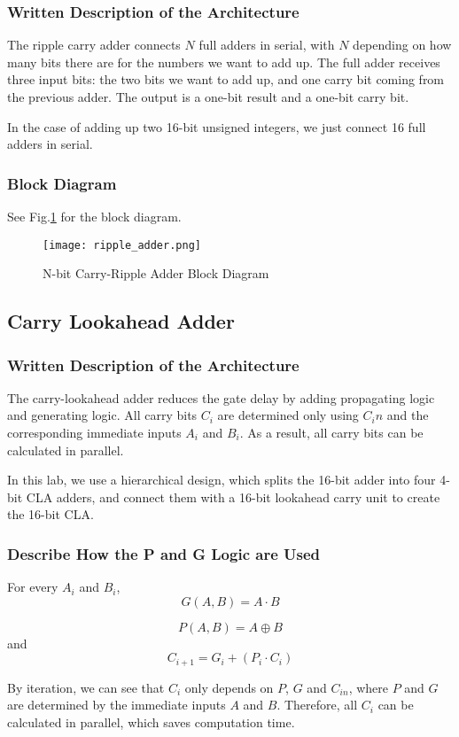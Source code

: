 \documentclass[11pt]{article}
\begin{document}
\subsubsection{Written Description of the Architecture}
The ripple carry adder connects $N$ full adders in serial, with $N$ depending on how many bits there are for the numbers we want to add up. The full adder receives three input bits: the two bits we want to add up, and one carry bit coming from the previous adder. The output is a one-bit result and a one-bit carry bit.

In the case of adding up two 16-bit unsigned integers, we just connect 16 full adders in serial.
\subsubsection{Block Diagram}
See Fig.\ref{ripple} for the block diagram.
\begin{figure}[h]
    \centering
    \texttt{[image: ripple\_adder.png]}
    \caption{N-bit Carry-Ripple Adder Block Diagram}
    \label{ripple}
\end{figure}

\subsection{Carry Lookahead Adder}
\subsubsection{Written Description of the Architecture}
The carry-lookahead adder reduces the gate delay by adding propagating logic and generating logic. All carry bits $C_i$ are determined only using $C_in$ and the corresponding immediate inputs $A_i$ and $B_i$. As a result, all carry bits can be calculated in parallel.

In this lab, we use a hierarchical design, which splits the 16-bit adder into four 4-bit CLA adders, and connect them with a 16-bit lookahead carry unit to create the 16-bit CLA.

\subsubsection{Describe How the P and G Logic are Used}
For every $A_i$ and $B_i$, $$G(A,B)=A\cdot B$$

$$P(A,B)=A\oplus B$$ and $$C_{i+1}=G_i+(P_i\cdot C_i)$$

By iteration, we can see that $C_i$ only depends on $P$, $G$ and $C_{in}$, where $P$ and $G$ are determined by the immediate inputs $A$ and $B$. Therefore, all $C_i$ can be calculated in parallel, which saves computation time.
\end{document}
